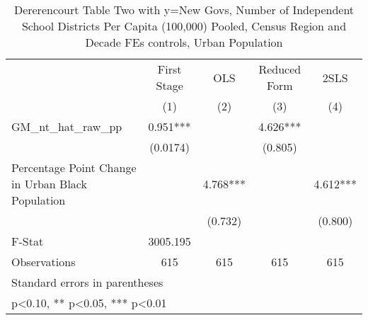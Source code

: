 \begin{table}[htbp]\centering
\def\sym#1{\ifmmode^{#1}\else\(^{#1}\)\fi}
\caption{Dererencourt Table Two with y=New Govs, Number of Independent School Districts Per Capita (100,000) Pooled, Census Region and Decade FEs controls, Urban Population}
\begin{tabular}{l*{4}{c}}
\toprule
                    & First Stage   &         OLS   &Reduced Form   &        2SLS   \\
                    &\multicolumn{1}{c}{(1)}   &\multicolumn{1}{c}{(2)}   &\multicolumn{1}{c}{(3)}   &\multicolumn{1}{c}{(4)}   \\
\midrule
GM\_nt\_hat\_raw\_pp    &       0.951***&               &       4.626***&               \\
                    &    (0.0174)   &               &     (0.805)   &               \\
\addlinespace
Percentage Point Change in Urban Black Population&               &       4.768***&               &       4.612***\\
                    &               &     (0.732)   &               &     (0.800)   \\
\midrule
F-Stat              &    3005.195   &               &               &               \\
Observations        &         615   &         615   &         615   &         615   \\
\bottomrule
\multicolumn{5}{l}{\footnotesize Standard errors in parentheses}\\
\multicolumn{5}{l}{\footnotesize * p<0.10, ** p<0.05, *** p<0.01}\\
\end{tabular}
\end{table}
